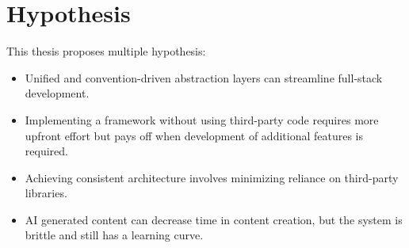 \section{Hypothesis}\label{sec:introduction-hypothesis}
This thesis proposes multiple hypothesis:

\begin{itemize}
    \item Unified and convention-driven abstraction layers can streamline full-stack development.
    \item Implementing a framework without using third-party code requires more upfront effort but pays off when development
        of additional features is required.
    \item Achieving consistent architecture involves minimizing reliance on third-party libraries.
    \item AI generated content can decrease time in content creation, but the system is brittle and still has a learning curve.
\end{itemize}
